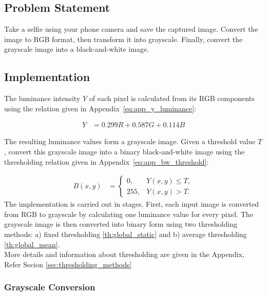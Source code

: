 

\subsection{Problem Statement}
\label{sec:problem_statement}

Take a selfie using your phone camera and save the captured image. Convert the image to RGB format, then transform it into grayscale. Finally, convert the grayscale image into a black-and-white image.

\subsection{Implementation}
\label{sec:implementation}

The luminance intensity $Y$ of each pixel is calculated from its RGB components using the relation given in Appendix~\eqref{eq:app_y_luminance}:

\begin{align}
Y &= 0.299R + 0.587G + 0.114B
\label{eq:problem_y_luminance}
\end{align}

The resulting luminance values form a grayscale image. Given a threshold value $T$, convert this grayscale image into a binary black-and-white image using the thresholding relation given in Appendix~\eqref{eq:app_bw_threshold}:

\begin{align}
B(x,y) &=
\begin{cases}
0, & Y(x,y) \leq T,\\
255, & Y(x,y) > T.
\end{cases}
\label{eq:problem_bw_threshold}
\end{align}
The implementation is carried out in stages. First, each input image is converted from RGB to grayscale by calculating one luminance value for every pixel. The grayscale image is then converted into binary form using two thresholding methods: a) fixed thresholding \eqref{th:global_static} and b) average thresholding \eqref{th:global_mean}.\\More details and information about thresholding are given in the Appendix, Refer Secion \eqref{sec:thresholding_methods}


\subsubsection{Grayscale Conversion}

